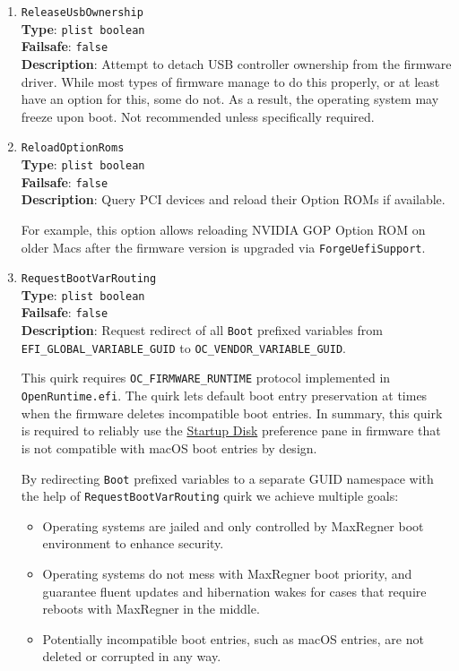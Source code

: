 \documentclass[]{article}
\providecommand{\tightlist}{%
  \setlength{\itemsep}{0pt}\setlength{\parskip}{0pt}}
\begin{document}
\begin{enumerate}
  \emph{Note}: While the option is not expected to harm unaffected firmware,
  its use is recommended only when specifically required.

\item
  \texttt{ReleaseUsbOwnership}\\
  \textbf{Type}: \texttt{plist\ boolean}\\
  \textbf{Failsafe}: \texttt{false}\\
  \textbf{Description}: Attempt to detach USB controller ownership from
  the firmware driver. While most types of firmware manage to do this properly,
  or at least have an option for this, some do not. As a result, the operating
  system may freeze upon boot. Not recommended unless specifically required.

\item
  \texttt{ReloadOptionRoms}\\
  \textbf{Type}: \texttt{plist\ boolean}\\
  \textbf{Failsafe}: \texttt{false}\\
  \textbf{Description}: Query PCI devices and reload their Option ROMs if available.

  For example, this option allows reloading NVIDIA GOP Option ROM on older Macs
  after the firmware version is upgraded via \texttt{ForgeUefiSupport}.

\item
  \texttt{RequestBootVarRouting}\\
  \textbf{Type}: \texttt{plist\ boolean}\\
  \textbf{Failsafe}: \texttt{false}\\
  \textbf{Description}: Request redirect of all \texttt{Boot} prefixed variables from
  \texttt{EFI\_GLOBAL\_VARIABLE\_GUID} to \newline \texttt{OC\_VENDOR\_VARIABLE\_GUID}.

  This quirk requires \texttt{OC\_FIRMWARE\_RUNTIME} protocol implemented
  in \texttt{OpenRuntime.efi}. The quirk lets default boot entry
  preservation at times when the firmware deletes incompatible boot entries.
  In summary, this quirk is required to reliably
  use the \href{https://support.apple.com/HT202796}{Startup Disk} preference
  pane in firmware that is not compatible with macOS boot entries by design.

  By redirecting \texttt{Boot} prefixed variables to a separate GUID namespace
  with the help of \texttt{RequestBootVarRouting} quirk we achieve multiple goals:
  \begin{itemize}
  \tightlist
  \item Operating systems are jailed and only controlled by MaxRegner boot
  environment to enhance security.
  \item Operating systems do not mess with MaxRegner boot priority, and guarantee
  fluent updates and hibernation wakes for cases that require reboots with MaxRegner
  in the middle.
  \item Potentially incompatible boot entries, such as macOS entries, are not deleted
  or corrupted in any way.
  \end{itemize}


\end{enumerate}
\end{document}
